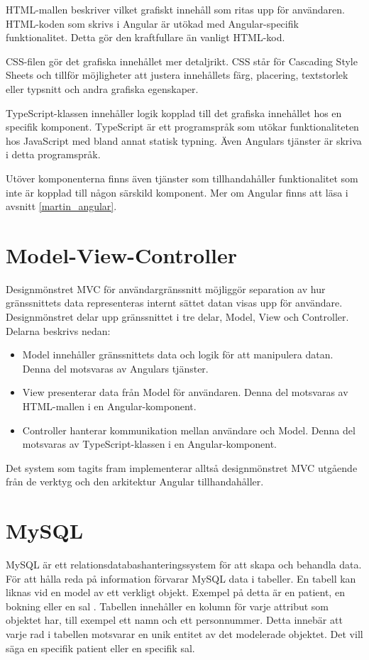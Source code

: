 HTML-mallen beskriver vilket grafiskt innehåll som ritas upp för användaren. HTML-koden som skrivs i Angular är utökad med Angular-specifik funktionalitet. Detta gör den kraftfullare än vanligt HTML-kod.

CSS-filen gör det grafiska innehållet mer detaljrikt. CSS står för Cascading Style Sheets och tillför möjligheter att justera innehållets färg, placering, textstorlek eller typsnitt och andra grafiska egenskaper.  

TypeScript-klassen innehåller logik kopplad till det grafiska innehållet hos en specifik komponent. TypeScript är ett programspråk som utökar funktionaliteten hos JavaScript med bland annat statisk typning. Även Angulars tjänster är skriva i detta programspråk.

Utöver komponenterna finns även tjänster som tillhandahåller funktionalitet som inte är kopplad till någon särskild komponent. Mer om Angular finns att läsa i avsnitt \ref{martin_angular}.

\section{Model-View-Controller} \label{mvc-ref}

Designmönstret MVC för användargränssnitt möjliggör separation av hur gränssnittets data representeras internt sättet datan visas upp för användare. Designmönstret delar upp gränssnittet i tre delar, Model, View och Controller.\cite{mvc} Delarna beskrivs nedan:
\begin{itemize}
  \item Model innehåller gränssnittets data och logik för att manipulera datan. Denna del motsvaras av Angulars tjänster. 
  \item View presenterar data från Model för användaren. Denna del motsvaras av HTML-mallen i en Angular-komponent.
  \item Controller hanterar kommunikation mellan användare och Model. Denna del motsvaras av TypeScript-klassen i en Angular-komponent. 
\end{itemize}

Det system som tagits fram implementerar alltså designmönstret MVC utgående från de verktyg och den arkitektur Angular tillhandahåller. 
 
\section{MySQL}
MySQL är ett relationsdatabashanteringssystem för att skapa och behandla data. För att hålla reda på 
information förvarar MySQL data i tabeller. En tabell kan liknas vid en model av ett verkligt objekt. 
Exempel på detta är en patient, en bokning eller en sal \cite{mysql}. Tabellen innehåller en kolumn för varje 
attribut som objektet har, till exempel ett namn och ett personnummer. Detta innebär att varje rad i 
tabellen motsvarar en unik entitet av det modelerade objektet. Det vill säga en specifik patient eller 
en specifik sal.

